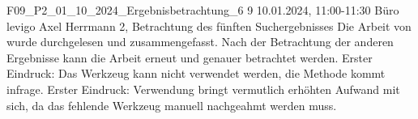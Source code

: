 \fieldnote
{F09\_P2\_01\_10\_2024\_Ergebnisbetrachtung\_6}
{9}
{10.01.2024, 11:00-11:30}
{Büro levigo}
{Axel Herrmann}
{2, Betrachtung des fünften Suchergebnisses}
{
  Die Arbeit von  wurde durchgelesen und zusammengefasst.
}
{
  Nach der Betrachtung der anderen Ergebnisse kann die Arbeit erneut und genauer betrachtet werden.
}
{
  Erster Eindruck: Das Werkzeug kann nicht verwendet werden, die Methode kommt infrage.
}
{
  Erster Eindruck: Verwendung bringt vermutlich erhöhten Aufwand mit sich, da das fehlende Werkzeug manuell nachgeahmt werden muss.
}
{
}

